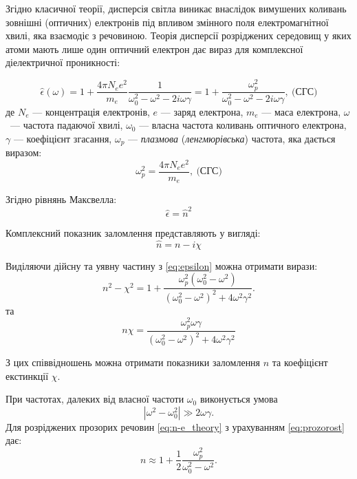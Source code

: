 Згідно класичної теорії, дисперсія світла виникає внаслідок вимушених коливань зовнішні (оптичних) електронів під впливом змінного поля електромагнітної хвилі, яка взаємодіє з речовиною. Теорія дисперсії розріджених середовищ у яких атоми мають лише один оптичний електрон дає вираз для комплексної діелектричної проникності:


\begin{equation}\label{eq:epsilon}
	\hat{\epsilon}(\omega)  = 1 + \frac{4\pi N_e e^2}{m_e}\frac{1}{\omega_0^2 - \omega^2 - 2i\omega\gamma} = 1 + \frac{\omega_p^2}{\omega_0^2 - \omega^2 - 2i\omega\gamma}, \ \text{(СГС)}
\end{equation}
де $N_e$ --- концентрація електронів, $e$ --- заряд електрона, $m_e$ --- маса електрона, $ \omega $~--- частота падаючої хвилі, $ \omega_0 $ --- власна частота коливань оптичного електрона, $ \gamma $ --- коефіцієнт згасання, $\omega_p$ --- \emph{плазмова} (\emph{ленгмюрівська}) частота, яка дається виразом:
\begin{equation}\label{eq:Lengmur}
	\omega_p^2 = \frac{4\pi N_e e^2}{m_e},\  \text{(СГС)}
\end{equation}


Згідно рівнянь Максвелла:
\begin{equation}\label{eq_dispersio:e=n^2}
	\hat{\epsilon} = \hat{n}^2
\end{equation}

Комплексний показник заломлення представляють у вигляді:
\begin{equation}\label{eq_dispersion: n}
	\hat{n} =  n  - i \chi
\end{equation}

Виділяючи дійсну та уявну частину з \eqref{eq:epsilon} можна отримати вирази:
\begin{equation}\label{eq:n-e_theory}
	n^2 - \chi^2 = 1 + \frac{\omega_p^2(\omega_0^2 - \omega^2)}{(\omega_0^2 - \omega^2)^2 + 4\omega^2\gamma^2}.
\end{equation}
та
\begin{equation}\label{eq:ne_theoty}
	n\chi = \frac{\omega_p^2 \omega\gamma}{(\omega_0^2 - \omega^2)^2 + 4\omega^2\gamma^2}
\end{equation}

З цих співвідношень можна отримати показники заломлення $n$ та коефіцієнт екстинкції $\chi$.

При частотах, далеких від власної частоти $\omega_0$ виконується умова
\begin{equation}\label{eq:prozorost}
	|\omega^2 - \omega_0^2| \gg 2\omega\gamma.
\end{equation}
Для розріджених прозорих речовин \eqref{eq:n-e_theory} з урахуванням \eqref{eq:prozorost} дає:
\begin{equation}\label{key}
	n \approx 1 + \frac12 \frac{\omega_p^2}{\omega_0^2 - \omega^2}.
\end{equation}

